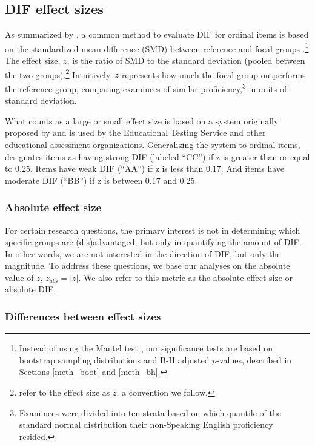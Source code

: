 \documentclass [PhD] {uclathes}
\begin{document}
\subsection{DIF effect sizes}
\label{meth_fx}

As summarized by \cite{michaelides2008}, a common method to evaluate DIF for ordinal items is based on the standardized mean difference (SMD) between reference and focal groups \citep{dorans1986}.\footnote{Instead of using the Mantel test \citep{mantel1963}, our significance tests are based on bootstrap sampling distributions and B-H adjusted $p$-values, described in Sections \ref{meth_boot} and \ref{meth_bh}.} The effect size, $z$, is the ratio of SMD to the standard deviation (pooled between the two groups).\footnote{\cite{ormerod2022automated} refer to the effect size as $z$, a convention we follow.} Intuitively, $z$ represents how much the focal group outperforms the reference group, comparing examinees of similar proficiency,\footnote{Examinees were divided into ten strata based on which quantile of the standard normal distribution their non-Speaking English proficiency resided.} in units of standard deviation.

What counts as a large or small effect size is based on a system originally proposed by \citet{zwick1993assessment} and is used by the Educational Testing Service and other educational assessment organizations. Generalizing the system to ordinal items, \citet[][p. 150]{naep2001} designates items as having strong DIF (labeled “CC”) if z is greater than or equal to 0.25. Items have weak DIF (“AA”) if z is less than 0.17. And items have moderate DIF (“BB”) if z is between 0.17 and 0.25.

\subsubsection{Absolute effect size}

For certain research questions, the primary interest is not in determining which specific groups are (dis)advantaged, but only in quantifying the amount of DIF. In other words, we are not interested in the direction of DIF, but only the magnitude. To address these questions, we base our analyses on the absolute value of $z$, $z_{abs} = |z|$. We also refer to this metric as the absolute effect size or absolute DIF.

\subsubsection{Differences between effect sizes}
\end{document}
